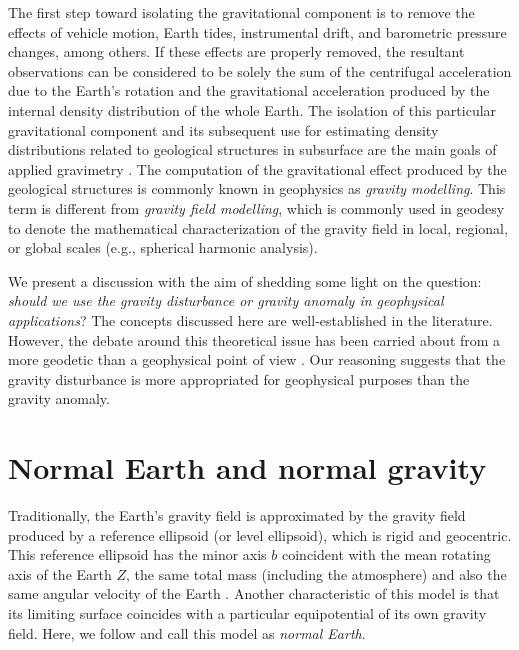 \documentclass[extra]{gji}
\begin{document}
The first step toward isolating the gravitational component
is to remove the effects of vehicle motion, Earth tides, instrumental drift,
and barometric pressure changes, among others.
If these effects are properly removed, the resultant
observations can be considered to be solely the sum of the
centrifugal acceleration due to the Earth's rotation and
the gravitational acceleration produced by
the internal density distribution of the whole Earth.
The isolation of this particular gravitational component
and its subsequent use for estimating density
distributions related to geological structures in subsurface
are the main goals of applied gravimetry \citep{blakely1996}.
The computation of the gravitational effect produced by
the geological structures is commonly known in geophysics as
\textit{gravity modelling}.
This term is different from \textit{gravity field modelling}, which
is commonly used in geodesy to denote the mathematical characterization of the
gravity field in local, regional, or global scales (e.g., spherical harmonic
analysis).

We present a discussion with the aim of shedding some light on the question:
\textit{should we use the gravity disturbance or gravity anomaly in geophysical
applications}?
The concepts discussed here are well-established in the literature.
However, the debate around this theoretical issue has been
carried about from a more geodetic than a geophysical point of view
\citep{lafehr1991,chapin1996,li2001,fairhead2003,
hackney-featherstone2003,hinze2005}.
Our reasoning suggests that the gravity disturbance is more appropriated for
geophysical purposes than the gravity anomaly.


\section{Normal Earth and normal gravity}

Traditionally, the Earth's gravity field is approximated
by the gravity field produced by a reference ellipsoid
(or level ellipsoid), which is rigid and geocentric.
This reference ellipsoid has the minor axis $b$
coincident with the mean rotating axis of the Earth $Z$, the
same total mass (including the atmosphere) and also the
same angular velocity of the Earth \citep{heiskanen-moritz1967,
vanicek1987,hofmann-wellenhof-moritz2005,torge2012}.
Another characteristic of this model is that its
limiting surface coincides with a particular equipotential
of its own gravity field.
Here, we follow \citep{torge2012} and call this model as
\textit{normal Earth}.
\end{document}
